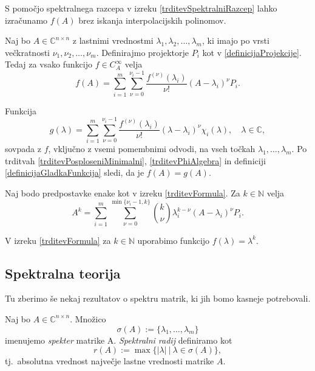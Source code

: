\documentclass[mat1]{fmfdelo}
\newcommand{\N}{\mathbb N}
\newcommand{\C}{\mathbb C}
\begin{document}
S pomočjo spektralnega razcepa v izreku \ref{trditevSpektralniRazcep} lahko izračunamo $f(A)$ brez iskanja interpolacijskih polinomov.
\begin{izrek} \label{trditevFormula}
    Naj bo $A \in \C^{n \times n}$ z lastnimi vrednostmi $\lambda_1, \lambda_2, \ldots, \lambda_m$, ki imajo po vrsti večkratnosti $\nu_1, \nu_2, \ldots, \nu_m$. Definirajmo projektorje $P_i$ kot v \eqref{definicijaProjekcije}. Tedaj za vsako funkcijo $f \in C_A^\infty$ velja
    \begin{equation*}
        f(A) = \sum_{i=1}^m \sum_{\nu = 0}^{\nu_i - 1} \frac{f^{(\nu)}(\lambda_i)}{\nu !}(A - \lambda_i)^\nu P_i.
    \end{equation*}
\end{izrek}
\begin{dokaz}
    Funkcija
    \begin{equation*}
        g(\lambda) = \sum_{i=1}^m \sum_{\nu = 0}^{\nu_i - 1} \frac{f^{(\nu)}(\lambda_i)}{\nu !}(\lambda - \lambda_i)^\nu \chi_i(\lambda), \quad \lambda \in \C,
    \end{equation*}
    sovpada z $f$, vključno z vsemi pomembnimi odvodi, na vseh točkah $\lambda_1, \ldots, \lambda_m$.  Po trditvah \ref{trditevPosploseniMinimalni}, \ref{trditevPhiAlgebra} in definiciji \ref{definicijaGladkaFunkcija} sledi, da je $f(A) = g(A)$.
\end{dokaz}
\begin{posledica}
    Naj bodo predpostavke enake kot v izreku \ref{trditevFormula}. Za $k \in \N$ velja
    \begin{equation}\label{formulaMatricnePotence}
        A^k = \sum_{i=1}^m \sum_{\nu = 0}^{\min \{\nu_i - 1, k\}} {k \choose \nu} \lambda_i^{k-\nu}(A - \lambda_i)^\nu P_i.
    \end{equation}
\end{posledica}
\begin{dokaz}
    V izreku \ref{trditevFormula} za $k \in \N$ uporabimo funkcijo $f(\lambda) = \lambda^k$.
\end{dokaz}

\subsection{Spektralna teorija}
Tu zberimo še nekaj rezultatov o spektru matrik, ki jih bomo kasneje potrebovali.
\begin{definicija}
    Naj bo $A \in \C^{n \times n}$. Množico
    \begin{equation*}
        \sigma(A) := \{\lambda_1, \ldots, \lambda_m\}
    \end{equation*}
    imenujemo \emph{spekter} matrike A. \emph{Spektralni radij} definiramo kot
    \begin{equation*}
        r(A) := \max \{|\lambda|\ |\ \lambda \in \sigma(A)\},
    \end{equation*}
    tj.\ absolutna vrednost največje lastne vrednosti matrike $A$.
\end{definicija}
\end{document}
